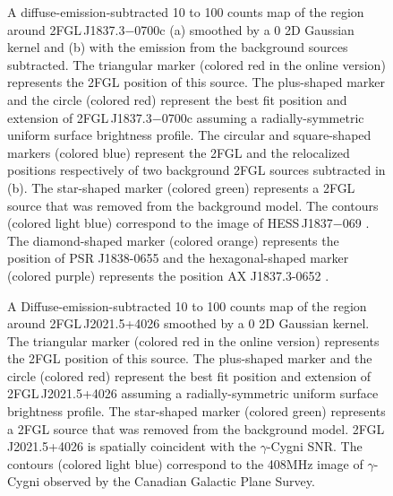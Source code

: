 \documentclass[12pt,preprint]{aastex}
\newif\ifcolorfigure
\newcommand{\gev}{\text{GeV}\xspace}
\newcommand{\tev}{\text{TeV}\xspace}
\begin{document}
\begin{figure}
    \ifcolorfigure
      \plotone{source_plots/source_HESS_J1837-069_color.eps}
    \else
    \fi
  \caption{
  A diffuse-emission-subtracted 10 \gev to 100 \gev counts map of the
  region around 2FGL\,J1837.3$-$0700c (a) smoothed by a 0 2D Gaussian
  kernel and (b) with the emission from the background sources subtracted.
  The triangular marker (colored red in the online version) represents
  the 2FGL
  position of this source. 
  The plus-shaped marker and 
  the circle (colored red) represent the best fit position and extension
  of 2FGL\,J1837.3$-$0700c assuming a radially-symmetric uniform surface
  brightness profile. The circular and square-shaped markers (colored
  blue) represent the 2FGL and the relocalized positions respectively of
  two background 2FGL sources subtracted in (b).  The star-shaped marker
  (colored green) represents a 2FGL source that was removed from the
  background model.  The contours (colored light blue) correspond to
  the \tev image of HESS\,J1837$-$069
  \citep{hess_plane_survey}.
  The diamond-shaped marker (colored orange) represents the position of PSR J1838-0655
  and the hexagonal-shaped marker (colored purple) represents the position AX J1837.3-0652
  \citep{pulsations_HESS_J1837-069}.
  }\label{1FGL_J1837.5-0659c}
\end{figure}


\begin{figure}
    \ifcolorfigure
      \plotone{source_plots/source_Gamma_Cygni_color.eps}
    \else
    \fi
  \caption{A Diffuse-emission-subtracted 
  10 \gev to 100 \gev counts map of the
  region around 2FGL\,J2021.5+4026 smoothed by a 0 2D Gaussian
  kernel. The triangular marker (colored red in the online version)
  represents the 2FGL position of this source.  The plus-shaped
  marker and the circle (colored red) represent the best fit position
  and extension of 2FGL\,J2021.5+4026 assuming a radially-symmetric
  uniform surface brightness profile.  
  The star-shaped marker (colored green)
  represents a 2FGL source that was removed from the background model.
  2FGL\,J2021.5+4026
  is spatially coincident with the $\gamma$-Cygni SNR.  The contours
  (colored light blue) correspond to the 408MHz image of $\gamma$-Cygni
  observed by the Canadian Galactic Plane Survey.
  }\label{1FGL_J2020.0+4049}
\end{figure}
\end{document}
